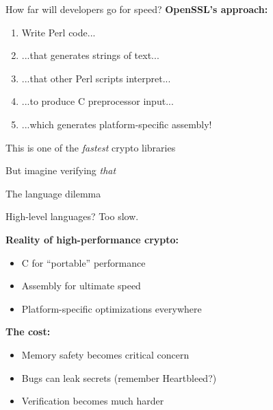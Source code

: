 \documentclass[aspectratio=169, lualatex, handout]{beamer}
\begin{document}
\begin{frame}{How far will developers go for speed?}
	\textbf{OpenSSL's approach:}
	\begin{enumerate}
		\item Write Perl code...
		\item ...that generates strings of text...
		\item ...that other Perl scripts interpret...
		\item ...to produce C preprocessor input...
		\item ...which generates platform-specific assembly!
	\end{enumerate}
	\vspace{1em}
	\begin{center}
		\Large
		This is one of the \textit{fastest} crypto libraries

		\vspace{0.5em}

		\normalsize
		But imagine verifying \textit{that}
	\end{center}
\end{frame}

\begin{frame}{The language dilemma}
	\begin{center}
		\Large
		High-level languages? Too slow.
	\end{center}
	\vspace{1em}
	\textbf{Reality of high-performance crypto:}
	\begin{itemize}
		\item C for ``portable'' performance
		\item Assembly for ultimate speed
		\item Platform-specific optimizations everywhere
	\end{itemize}
	\vspace{0.5em}
	\textbf{The cost:}
	\begin{itemize}
		\item Memory safety becomes critical concern
		\item Bugs can leak secrets (remember Heartbleed?)
		\item Verification becomes much harder
	\end{itemize}
\end{frame}
\end{document}
